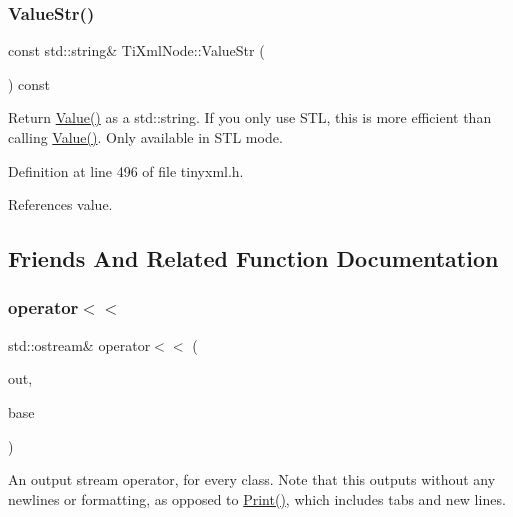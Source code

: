 \subsubsection{\texorpdfstring{Value\+Str()}{ValueStr()}}
{\footnotesize\ttfamily const std\+::string\& Ti\+Xml\+Node\+::\+Value\+Str (\begin{DoxyParamCaption}{ }\end{DoxyParamCaption}) const\hspace{0.3cm}{\ttfamily [inline]}}

Return \hyperlink{class_ti_xml_node_ad44dfe927d49a74dd78b72b7514417ad}{Value()} as a std\+::string. If you only use S\+TL, this is more efficient than calling \hyperlink{class_ti_xml_node_ad44dfe927d49a74dd78b72b7514417ad}{Value()}. Only available in S\+TL mode. 

Definition at line 496 of file tinyxml.\+h.



References value.



\subsection{Friends And Related Function Documentation}
\hypertarget{class_ti_xml_node_a86cd49cfb17a844c0010b3136ac966c7}{}\label{class_ti_xml_node_a86cd49cfb17a844c0010b3136ac966c7} 
\subsubsection{\texorpdfstring{operator$<$$<$}{operator<<}\hspace{0.1cm}{\footnotesize\ttfamily [1/2]}}
{\footnotesize\ttfamily std\+::ostream\& operator$<$$<$ (\begin{DoxyParamCaption}\item[{std\+::ostream \&}]{out,  }\item[{const \hyperlink{class_ti_xml_node}{Ti\+Xml\+Node} \&}]{base }\end{DoxyParamCaption})\hspace{0.3cm}{\ttfamily [friend]}}

An output stream operator, for every class. Note that this outputs without any newlines or formatting, as opposed to \hyperlink{class_ti_xml_base_a0de56b3f2ef14c65091a3b916437b512}{Print()}, which includes tabs and new lines.

